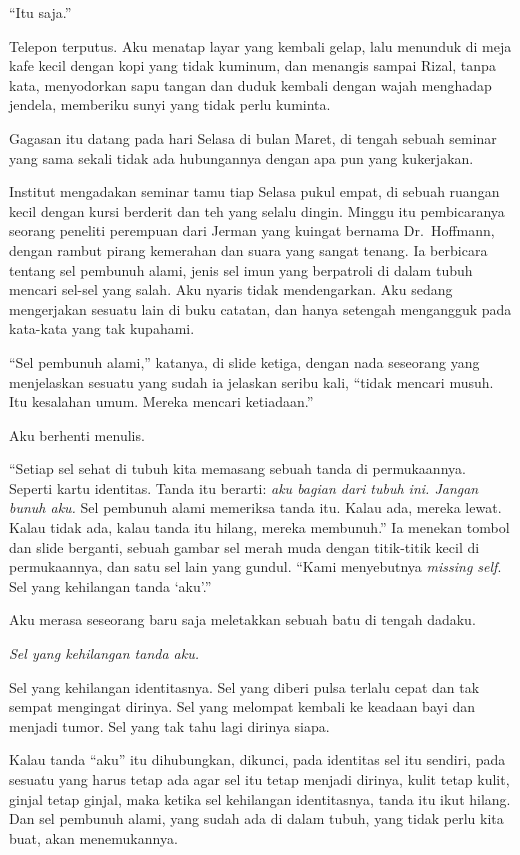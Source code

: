 \documentclass[11pt,twoside,openany]{book}
\makeatletter
\newcommand{\scenebreak}{\par\vspace{0.9em}{\centering\textsc{*\hspace{0.7em}*\hspace{0.7em}*}\par}\vspace{0.9em}\@afterindentfalse\@afterheading}
\makeatother
\begin{document}
``Itu saja.''

Telepon terputus. Aku menatap layar yang kembali gelap, lalu menunduk di meja kafe kecil dengan kopi yang tidak kuminum, dan menangis sampai Rizal, tanpa kata, menyodorkan sapu tangan dan duduk kembali dengan wajah menghadap jendela, memberiku sunyi yang tidak perlu kuminta.

\scenebreak
Gagasan itu datang pada hari Selasa di bulan Maret, di tengah sebuah seminar yang sama sekali tidak ada hubungannya dengan apa pun yang kukerjakan.

Institut mengadakan seminar tamu tiap Selasa pukul empat, di sebuah ruangan kecil dengan kursi berderit dan teh yang selalu dingin. Minggu itu pembicaranya seorang peneliti perempuan dari Jerman yang kuingat bernama Dr.~Hoffmann, dengan rambut pirang kemerahan dan suara yang sangat tenang. Ia berbicara tentang sel pembunuh alami, jenis sel imun yang berpatroli di dalam tubuh mencari sel-sel yang salah. Aku nyaris tidak mendengarkan. Aku sedang mengerjakan sesuatu lain di buku catatan, dan hanya setengah mengangguk pada kata-kata yang tak kupahami.

``Sel pembunuh alami,'' katanya, di slide ketiga, dengan nada seseorang yang menjelaskan sesuatu yang sudah ia jelaskan seribu kali, ``tidak mencari musuh. Itu kesalahan umum. Mereka mencari ketiadaan.''

Aku berhenti menulis.

``Setiap sel sehat di tubuh kita memasang sebuah tanda di permukaannya. Seperti kartu identitas. Tanda itu berarti: \emph{aku bagian dari tubuh ini. Jangan bunuh aku.} Sel pembunuh alami memeriksa tanda itu. Kalau ada, mereka lewat. Kalau tidak ada, kalau tanda itu hilang, mereka membunuh.'' Ia menekan tombol dan slide berganti, sebuah gambar sel merah muda dengan titik-titik kecil di permukaannya, dan satu sel lain yang gundul. ``Kami menyebutnya \emph{missing self}. Sel yang kehilangan tanda `aku'.''

Aku merasa seseorang baru saja meletakkan sebuah batu di tengah dadaku.

\emph{Sel yang kehilangan tanda aku.}

Sel yang kehilangan identitasnya. Sel yang diberi pulsa terlalu cepat dan tak sempat mengingat dirinya. Sel yang melompat kembali ke keadaan bayi dan menjadi tumor. Sel yang tak tahu lagi dirinya siapa.

Kalau tanda ``aku'' itu dihubungkan, dikunci, pada identitas sel itu sendiri, pada sesuatu yang harus tetap ada agar sel itu tetap menjadi dirinya, kulit tetap kulit, ginjal tetap ginjal, maka ketika sel kehilangan identitasnya, tanda itu ikut hilang. Dan sel pembunuh alami, yang sudah ada di dalam tubuh, yang tidak perlu kita buat, akan menemukannya.
\end{document}
